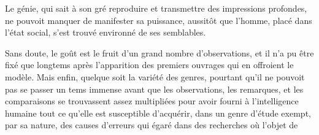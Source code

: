 \documentclass[11pt,a4paper]{article}
\begin{document}
Le génie, qui sait à son gré  reproduire et transmettre
des impressions profondes, ne pouvoit  manquer de manifester
sa puissance, aussitôt que l'homme, placé dans l'état social, s'est trouvé
environné de ses semblables.

Sans doute, le goût est le fruit d'un grand nombre d'observations, et il n'a
pu être fixé que  longtems après l'apparition des
\struck{\ill{}} premiers ouvrages qui en offroient le modèle. Mais enfin,
quelque soit la variété des genres,  pourtant qu'il ne
pouvoit pas se passer un tems immense avant que les 
observations, les remarques, et les comparaisons se trouvassent assez
multipliées pour avoir fourni à l'intelligence humaine tout ce qu'elle est
susceptible d'acquérir, dans un genre d'étude  exempt, par sa nature,  des causes
d'erreurs qui  égaré dans des recherches où l'objet de
\end{document}
